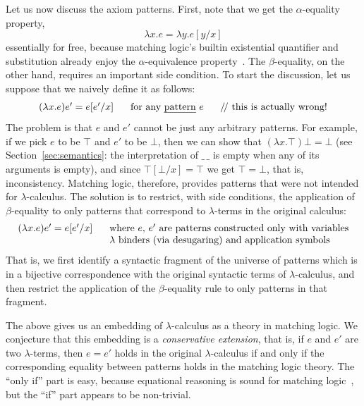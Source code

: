 \documentclass[UTF8,11pt]{article}
\theoremstyle{plain}
\theoremstyle{definition}
\theoremstyle{remark}
\newcommand{\doubleslash}{/\!/{ }}
\begin{document}
Let us now discuss the axiom patterns.
First, note that we get the $\alpha$-equality property,
$$
\lambda x . e = \lambda y . e[y/x]
$$
essentially for free, because matching logic's builtin existential quantifier
and substitution already enjoy the $\alpha$-equivalence
property~\cite{rosu-2017-lmcs}.
The $\beta$-equality, on the other hand, requires an important side condition.
To start the discussion, let us suppose that we naively define it as follows:
$$
\begin{array}{r@{\hspace*{4ex}}l}
(\lambda x . e)e' = e[e'/x]
&
\textrm{for any \emph{pattern} $e$ \ \ \ \ \doubleslash this is actually wrong!}
\end{array}
$$
The problem is that $e$ and $e'$ cannot be just any arbitrary patterns.
For example, if we pick $e$ to be $\top$ and $e'$ to be $\bot$, then
we can show that $(\lambda x . \top)\bot = \bot$
(see Section~\ref{sec:semantics}: the interpretation of $\_\,\_$ is empty
when any of its arguments is empty), and since $\top[\bot/x] = \top$ we
get $\top = \bot$, that is, inconsistency.
Matching logic, therefore, provides patterns that were not intended for
$\lambda$-calculus.
The solution is to restrict, with side conditions, the application of
$\beta$-equality to only patterns that correspond to $\lambda$-terms
in the original calculus:
$$
\begin{array}{r@{\hspace*{4ex}}l}
(\lambda x . e)e' = e[e'/x]
& \textrm{where $e$, $e'$ are patterns constructed only with variables}
\\
& \textrm{$\lambda$ binders (via desugaring) and application symbols}
\end{array}
$$
That is, we first identify a syntactic fragment of the universe of
patterns which is in a bijective correspondence with the original
syntactic terms of $\lambda$-calculus, and then restrict the
application of the $\beta$-equality rule to only patterns in that 
fragment.

The above gives us an embedding of $\lambda$-calculus as a theory
in matching logic.
We conjecture that this embedding is a \emph{conservative extension},
that is, if $e$ and $e'$ are two $\lambda$-terms, then $e=e'$ holds
in the original $\lambda$-calculus if and only if the corresponding
equality between patterns holds in the matching logic theory.
The ``only if'' part is easy, because equational reasoning is sound
for matching logic~\cite{rosu-2017-lmcs}, but the ``if'' part appears
to be non-trivial.
\end{document}
